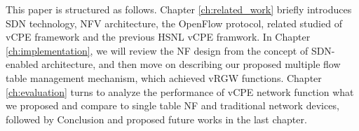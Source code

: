 This paper is structured as follows.
Chapter \ref{ch:related_work} briefly introduces SDN technology, NFV architecture, the OpenFlow protocol, related studied of vCPE framework and the previous HSNL vCPE framwork.
In Chapter \ref{ch:implementation}, we will review the NF design from the concept of SDN-enabled \cite{sdn-enabled} architecture, and then move on describing our proposed multiple flow table management mechanism, which achieved vRGW functions.
Chapter \ref{ch:evaluation} turns to analyze the performance of vCPE network function what we proposed and compare to single table NF and traditional network devices, followed by Conclusion and proposed future works in the last chapter.
